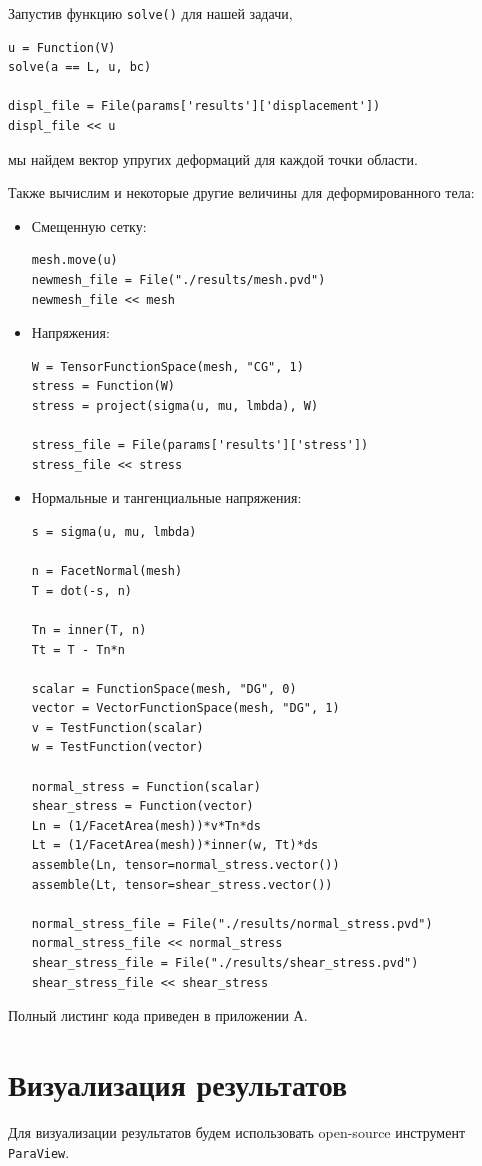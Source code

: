 \documentclass[a4paper, 14pt]{extreport}
\begin{document}
Запустив функцию \texttt{solve()} для нашей задачи,
\begin{lstlisting}
u = Function(V)
solve(a == L, u, bc)

displ_file = File(params['results']['displacement'])
displ_file << u
\end{lstlisting}
мы найдем вектор упругих деформаций для каждой точки области.

Также вычислим и некоторые другие величины для деформированного тела:
\begin{itemize}
	\item Смещенную сетку:
\begin{lstlisting}
mesh.move(u)
newmesh_file = File("./results/mesh.pvd")
newmesh_file << mesh
\end{lstlisting}

	\item Напряжения:
\begin{lstlisting}
W = TensorFunctionSpace(mesh, "CG", 1)
stress = Function(W)
stress = project(sigma(u, mu, lmbda), W)

stress_file = File(params['results']['stress'])
stress_file << stress
\end{lstlisting}

	\item Нормальные и тангенциальные напряжения:
\begin{lstlisting}
s = sigma(u, mu, lmbda)

n = FacetNormal(mesh)
T = dot(-s, n)

Tn = inner(T, n) 
Tt = T - Tn*n  

scalar = FunctionSpace(mesh, "DG", 0)
vector = VectorFunctionSpace(mesh, "DG", 1)
v = TestFunction(scalar)
w = TestFunction(vector)

normal_stress = Function(scalar)
shear_stress = Function(vector)
Ln = (1/FacetArea(mesh))*v*Tn*ds
Lt = (1/FacetArea(mesh))*inner(w, Tt)*ds
assemble(Ln, tensor=normal_stress.vector())
assemble(Lt, tensor=shear_stress.vector())

normal_stress_file = File("./results/normal_stress.pvd")
normal_stress_file << normal_stress
shear_stress_file = File("./results/shear_stress.pvd")
shear_stress_file << shear_stress
\end{lstlisting}
\end{itemize}

Полный листинг кода приведен в приложении А.

\section{Визуализация результатов}
Для визуализации результатов будем использовать open-source инструмент
\texttt{ParaView}.
\end{document}
